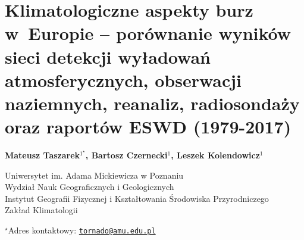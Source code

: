 \documentclass[\main/boa.tex]{subfiles}
\begin{document}
\section{{Klimatologiczne aspekty burz w~Europie -- porównanie wyników sieci detekcji wyładowań atmosferycznych, obserwacji naziemnych, reanaliz, radiosondaży oraz raportów ESWD (1979-2017)}}

\begin{center}
  {\bf {} Mateusz Taszarek$^{1^\star}$,   Bartosz Czernecki$^{1}$,  Leszek Kolendowicz$^{1}$ }
\end{center}

\vskip 0.3cm

\begin{affiliations}
\begin{enumerate}
\begin{minipage}{0.915\textwidth}
\centering
\item Uniwersytet im. Adama Mickiewicza w Poznaniu \\ Wydział Nauk Geograficznych i Geologicznych  \\ Instytut Geografii Fizycznej i Kształtowania Środowiska Przyrodniczego\\
Zakład Klimatologii \\[-2pt]
\end{minipage}
\end{enumerate}
$^\star$Adres kontaktowy: \href{mailto:tornado@amu.edu.pl}{\nolinkurl{tornado@amu.edu.pl}}\\
\end{affiliations}

\vskip 0.5cm


\vskip 0.5cm
\end{document}
